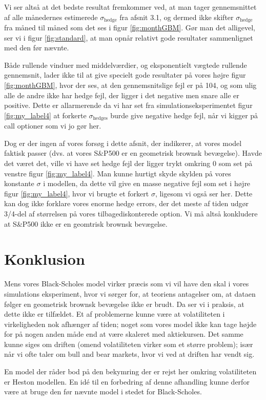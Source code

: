 \documentclass{article}
\theoremstyle{definition}
\theoremstyle{remark}
\begin{document}
Vi ser altså at det bedste resultat fremkommer ved, at man tager gennemsnittet af alle månedernes estimerede $\sigma_\text{hedge}$ fra afsnit 3.1, og dermed ikke skifter $\sigma_\text{hedge}$ fra måned til måned som det ses i figur \ref{fig:monthGBM}. Gør man det alligevel, ser vi i figur \ref{fig:standard}, at man opnår relativt gode resultater sammenlignet med den før nævnte.

Både rullende vinduer med middelværdier, og eksponentielt vægtede rullende gennemsnit, lader ikke til at give specielt gode resultater på vores højre figur \ref{fig:monthGBM}, hvor der ses, at den gennemsnitslige fejl er på 104, og som ulig alle de andre ikke har hedge fejl, der ligger i det negative men snare alle er positive. Dette er allarmerende da vi har set fra simulationseksperimentet figur \ref{fig:my_label4} at forkerte $\sigma_\text{hedges}$ burde give negative hedge fejl, når vi kigger på call optioner som vi jo gør her.

Dog er der ingen af vores forsøg i dette afsnit, der indikerer, at vores model faktisk passer (dvs. at vores S\&P500 er en geometrisk brownsk bevægelse). Havde det været det, ville vi have set hedge fejl der ligger trykt omkring 0 som set på venstre figur \ref{fig:my_label4}. Man kunne hurtigt skyde skylden på vores konstante $\sigma$ i modellen, da dette vil give en masse negative fejl som set i højre figur \ref{fig:my_label4}, hvor vi brugte et forkert $\sigma$, ligesom vi også ser her. Dette kan dog ikke forklare vores enorme hedge errors, der det meste af tiden udgør 3/4-del af størrelsen på vores tilbagediskonterede option. Vi må altså konkludere at S\&P500 ikke er en geomtrisk brownsk bevægelse.

\newpage

\section{Konklusion}
Mens vores Black-Scholes model virker præcis som vi vil have den skal i vores simulations eksperiment, hvor vi sørger for, at teoriens antagelser om, at dataen følger en geometrisk brownsk bevægelse ikke er brudt. Da ser vi i praksis, at dette ikke er tilfældet. Et af problemerne kunne være at volatiliteten i virkeligheden nok afhænger af tiden; noget som vores model ikke kan tage højde for på nogen anden måde end at være skaleret med aktiekursen. Det samme kunne siges om driften (omend volatiliteten virker som et større problem); især når vi ofte taler om bull and bear markets, hvor vi ved at driften har vendt sig.

En model der råder bod på den bekymring der er rejst her omkring volatiliteten er Heston modellen. En idé til en forbedring af denne afhandling kunne derfor være at bruge den før nævnte model i stedet for Black-Scholes.
\newpage





\end{document}

